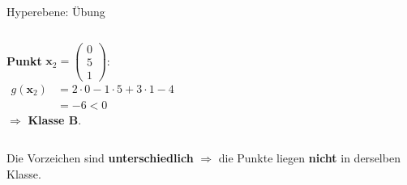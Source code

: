 {\begin{frame}{Hyperebene: Übung}
{\begin{columns}
\textbf{Punkt} $\mathbf{x}_2 = \begin{pmatrix} 0 \\ 5 \\ 1 \end{pmatrix}$:
\[
  \begin{aligned}
    g(\mathbf{x}_2) &= 2\cdot 0 - 1\cdot 5 + 3\cdot 1 - 4\\
                    &= -6 < 0
  \end{aligned}
\]
$\Rightarrow$ \textbf{Klasse B}.
\end{columns}

\vspace{2.4em}
Die Vorzeichen sind \textbf{unterschiedlich} $\Rightarrow$ die Punkte liegen
\textbf{nicht} in derselben Klasse.
}

\end{frame}
}


